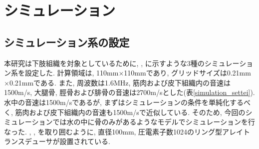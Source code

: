 \section{シミュレーション}
\subsection{シミュレーション系の設定\label{simulationmodel}}
本研究は下肢組織を対象としているために, ,  に示すような3種のシミュレーション系を設定した. 計算領域は, 110mm$\times$110mmであり, グリッドサイズは0.21mm$\times$0.21mmである. また, 周波数は1.6MHz, 筋肉および皮下組織内の音速は1500m/s, 大腿骨, 脛骨および腓骨の音速は2700m/sとした(表\ref{simulation_settei}). 水中の音速は1500m/sであるが, まずはシミュレーションの条件を単純化するべく, 筋肉および皮下組織内の音速も1500m/sで近似している. そのため, 今回のシミュレーションでは水の中に骨のみがあるようなモデルでシミュレーションを行なった. , ,  を取り囲むように, 直径100mm, 圧電素子数1024のリング型アレイトランスデューサが設置されている. 
